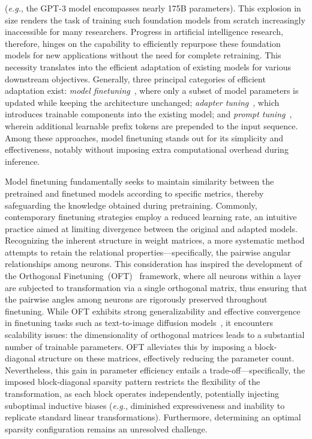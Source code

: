 (\emph{e.g.}, the GPT-3 model encompasses nearly 175B parameters). This explosion in size renders the task of training such foundation models from scratch increasingly inaccessible for many researchers. Progress in artificial intelligence research, therefore, hinges on the capability to efficiently repurpose these foundation models for new applications without the need for complete retraining. This necessity translates into the efficient adaptation of existing models for various downstream objectives. Generally, three principal categories of efficient adaptation exist: \emph{model finetuning}~\cite{hulora2022,zaken2022bitfit,guo2020parameter,raffel2020exploring,qiu2023controlling,zhang2022adaptive,chavan2023one}, where only a subset of model parameters is updated while keeping the architecture unchanged; \emph{adapter tuning}~\cite{rebuffi2017learning,houlsby2019parameter,pfeiffer2020adapterfusion,lin2020exploring,he2021towards}, which introduces trainable components into the existing model; and \emph{prompt tuning}~\cite{li2021prefix,lester2021power}, wherein additional learnable prefix tokens are prepended to the input sequence. Among these approaches, model finetuning stands out for its simplicity and effectiveness, notably without imposing extra computational overhead during inference.

Model finetuning fundamentally seeks to maintain similarity between the pretrained and finetuned models according to specific metrics, thereby safeguarding the knowledge obtained during pretraining. Commonly, contemporary finetuning strategies employ a reduced learning rate, an intuitive practice aimed at limiting divergence between the original and adapted models. Recognizing the inherent structure in weight matrices, a more systematic method attempts to retain the relational properties—specifically, the pairwise angular relationships among neurons. This consideration has inspired the development of the Orthogonal Finetuning~(OFT)~\cite{qiu2023controlling} framework, where all neurons within a layer are subjected to transformation via a single orthogonal matrix, thus ensuring that the pairwise angles among neurons are rigorously preserved throughout finetuning. While OFT exhibits strong generalizability and effective convergence in finetuning tasks such as text-to-image diffusion models~\cite{qiu2023controlling}, it encounters scalability issues: the dimensionality of orthogonal matrices leads to a substantial number of trainable parameters. OFT alleviates this by imposing a block-diagonal structure on these matrices, effectively reducing the parameter count. Nevertheless, this gain in parameter efficiency entails a trade-off—specifically, the imposed block-diagonal sparsity pattern restricts the flexibility of the transformation, as each block operates independently, potentially injecting suboptimal inductive biases (\emph{e.g.}, diminished expressiveness and inability to replicate standard linear transformations). Furthermore, determining an optimal sparsity configuration remains an unresolved challenge.


